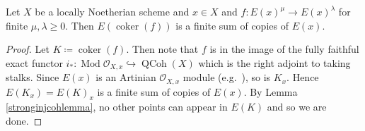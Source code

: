\documentclass[12pt,oneside]{amsart}
\DeclareMathOperator*{\coker}{coker}
\DeclareMathOperator{\Mod}{Mod}
\DeclareMathOperator{\QCoh}{QCoh}
\begin{document}
\begin{lemma} \label{injcohlemma}
Let $X$ be a locally Noetherian scheme and $x \in X$ and $f: E(x)^{\mu} \to E(x)^{\lambda}$ for finite $\mu,\lambda \geq 0$. Then $E(\coker(f))$ is a finite sum of copies of $E(x)$. 
\end{lemma}

\begin{proof}
Let $K \coloneq \coker(f)$. Then note that $f$ is in the image of the fully faithful exact functor $i_\ast: \Mod \mathcal{O}_{X,x} \hookrightarrow \QCoh(X)$ which is the right adjoint to taking stalks. Since $E(x)$ is an Artinian $\mathcal{O}_{X,x}$ module (e.g.\ \cite[Theorem 3.4.3]{EJ11}), so is $K_x$. Hence $E(K_x) = E(K)_x$ is a finite sum of copies of $E(x)$. By Lemma \ref{stronginjcohlemma}, no other points can appear in $E(K)$ and so we are done.
\end{proof}
\end{document}
